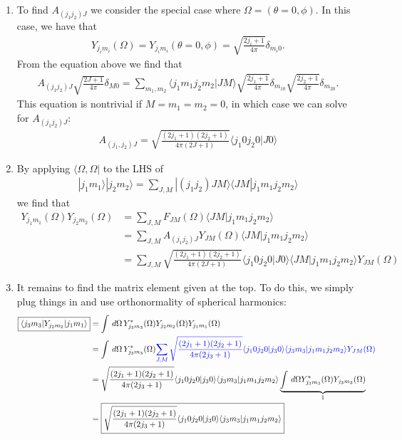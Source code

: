 \documentclass{article}
\theoremstyle{definition}
\newcommand{\f}[2]{\frac{#1}{#2}}
\begin{document}
\begin{enumerate}[label=(\alph*)]
	\item To find $A_{(j_1j_2)J}$ we consider the special case where $\Omega = (\theta=0,\phi)$. In this case, we have that
	\begin{align*}
	Y_{j_im_i}(\Omega) = Y_{j_im_i}(\theta=0,\phi) = \sqrt{\f{2j_i+1}{4\pi}} \delta_{m_i0}.
	\end{align*}
	From the equation above we find that
	\begin{align*}
	A_{(j_1j_2)J} \sqrt{\f{2J+1}{4\pi}} \delta_{M0} = \sum_{m_1,m_2}  \langle j_1m_1j_2m_2 | JM\rangle \sqrt{\f{2j_1+1}{4\pi}} \delta_{m_10} \sqrt{\f{2j_2+1}{4\pi}} \delta_{m_20}.
	\end{align*}
	This equation is nontrivial if $M=m_1=m_2 = 0$, in which case we can solve for $A_{(j_1j_2)J}$:
	\begin{align*}
	\boxed{A_{(j_1,j_2)J} =   \sqrt{\f{(2j_1+1)(2j_2+1)}{4\pi(2J+1)}} \langle j_1 0 j_2 0 | J 0  \rangle }
	\end{align*}
	
	
	\item By applying $\langle \Omega,\Omega|$ to the LHS of 
	\begin{align*}
	|j_1m_1\rangle | j_2m_2\rangle = \sum_{J,M} |(j_1j_2)JM\rangle \langle JM| j_1m_1j_2m_2\rangle
	\end{align*}
	we find that
	\begin{align*}
	\boxed{Y_{j_1m_1} (\Omega) Y_{j_2m_2} (\Omega) }
	&= \sum_{J,M} F_{JM}(\Omega) \langle JM| j_1m_1j_2m_2\rangle \\
	&= \sum_{J,M} A_{(j_1j_2)J} Y_{JM}(\Omega) \langle JM| j_1m_1j_2m_2\rangle\\
	&= \boxed{\sum_{J,M} \sqrt{\f{(2j_1+1)(2j_2+1)}{4\pi(2J+1)}} \langle j_1 0 j_2 0 | J 0  \rangle  \langle JM| j_1m_1j_2m_2\rangle Y_{JM}(\Omega)}
	\end{align*}
	
	\item It remains to find the matrix element given at the top. To do this, we simply plug things in and use orthonormality of spherical harmonics:
	\begin{align*}
	\boxed{\langle j_3 m_3| Y_{j_2m_2} |j_1m_1\rangle }
	&= \int \,d\Omega \, Y^*_{j_3m_3}(\Omega) Y_{j_2m_2}(\Omega) Y_{j_1m_1}(\Omega) \\
	&= \int \,d\Omega \, Y^*_{j_3m_3}(\Omega) \textcolor{blue}{\sum_{J,M} \sqrt{\f{(2j_1+1)(2j_2+1)}{4\pi(2j_3+1)}} \langle j_1 0 j_2 0 | j_3 0  \rangle  \langle j_3 m_3| j_1 m_1 j_2m_2\rangle Y_{JM}(\Omega)}\\
	&= \sqrt{\f{(2j_1+1)(2j_2+1)}{4\pi(2j_3+1)}} \langle j_1 0 j_2 0 | j_3 0  \rangle  \langle j_3 m_3| j_1 m_1 j_2m_2\rangle \underbrace{\int \, d\Omega Y^*_{j_3m_3}(\Omega) Y_{j_3m_3}(\Omega) }_{1}\\
	&= \boxed{ \sqrt{\f{(2j_1+1)(2j_2+1)}{4\pi(2j_3+1)}} \langle j_1 0 j_2 0 | j_3 0  \rangle  \langle j_3 m_3| j_1 m_1 j_2m_2\rangle}
	\end{align*}
	
	
\end{enumerate}
\end{document}
